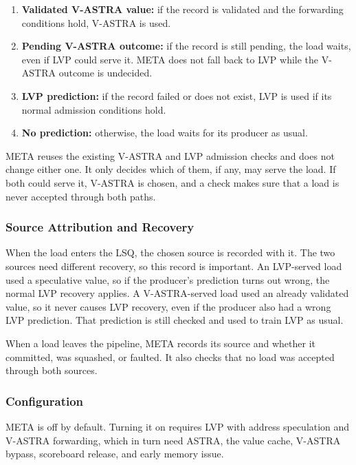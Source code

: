 \begin{enumerate}
    \item \textbf{Validated V-ASTRA value:} if the record is
    validated and the forwarding conditions hold, V-ASTRA is used.
    \item \textbf{Pending V-ASTRA outcome:} if the record is still
    pending, the load waits, even if LVP could serve it. META does not
    fall back to LVP while the V-ASTRA outcome is undecided.
    \item \textbf{LVP prediction:} if the record failed or does not
    exist, LVP is used if its normal admission conditions hold.
    \item \textbf{No prediction:} otherwise, the load waits for its
    producer as usual.
\end{enumerate}

META reuses the existing V-ASTRA and LVP admission checks and does not
change either one. It only decides which of them, if any, may serve
the load. If both could serve it, V-ASTRA is chosen, and a check
makes sure that a load is never accepted through both paths.

\subsubsection{Source Attribution and Recovery}

When the load enters the LSQ, the chosen source is recorded with it.
The two sources need different recovery, so this record is important.
An LVP-served load used a speculative value, so if the producer's
prediction turns out wrong, the normal LVP recovery applies. A
V-ASTRA-served load used an already validated value, so it never
causes LVP recovery, even if the producer also had a wrong LVP
prediction. That prediction is still checked and used to train LVP as
usual.

When a load leaves the
pipeline, META records its source and whether it committed, was
squashed, or faulted. It also checks that no load was accepted
through both sources.

\subsubsection{Configuration}

META is off by default. Turning it on requires LVP with address
speculation and V-ASTRA forwarding, which in turn need ASTRA, the
value cache, V-ASTRA bypass, scoreboard release, and early memory
issue.

